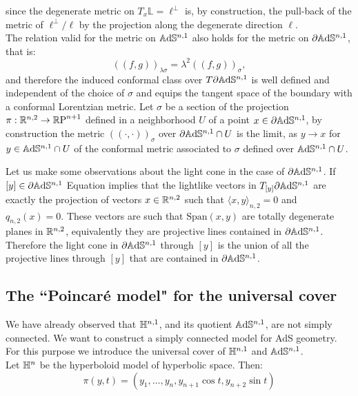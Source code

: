 since the degenerate metric on $T_x\mathbb{L}=\ell^\perp$ is, by construction, the pull-back of the metric of $\ell^{\perp}/\ell$ by the projection along the degenerate direction $\ell$.\\ 
The relation valid for the metric on $\mathbb{A}\mathrm{d}\mathbb{S}^{n,1}$ also holds for the metric on $\partial\mathbb{A}\mathrm{d}\mathbb{S}^{n,1}$, that is: 
\begin{equation}\label{26}
    ((f,g))_{\lambda\sigma}=\lambda^2((f,g))_{\sigma},
\end{equation} 
and therefore the induced conformal class over $T\partial\mathbb{A}\mathrm{d}\mathbb{S}^{n,1}$ is well defined and independent of the choice of $\sigma$ and equips the tangent space of the boundary with a conformal Lorentzian metric. %
Let $\sigma$ be a section of the projection $\pi:\mathbb{R}^{n,2}\to \mathbb{R}\text{P}^{n+1}$ defined in a neighborhood $U$ of a point $x\in\partial\mathbb{A}\mathrm{d}\mathbb{S}^{n,1}$, by construction the metric $((\cdot,\cdot))_\sigma$ over $\partial\mathbb{A}\mathrm{d}\mathbb{S}^{n,1}\cap U$ is the limit, as $y\to x$ for $y\in\mathbb{A}\mathrm{d}\mathbb{S}^{n,1}\cap U$ of the conformal metric associated to $\sigma$ defined over $\mathbb{A}\mathrm{d}\mathbb{S}^{n,1}\cap U$. 
\begin{observation}\label{222}
Let us make some observations about the light cone in the case of $\partial\mathbb{A}\mathrm{d}\mathbb{S}^{n,1}$. If $[y]\in\partial\mathbb{A}\mathrm{d}\mathbb{S}^{n,1}$ Equation  implies that the lightlike vectors in $T_{[y]}\partial\mathbb{A}\mathrm{d}\mathbb{S}^{n,1}$ are exactly the projection of vectors $x\in \mathbb{R}^{n,2}$ such that $\langle x,y\rangle_{n,2}=0$ and $q_{n,2}(x)=0$. These vectors are such that $\text{Span}(x,y)$ are totally degenerate planes in $\mathbb{R}^{n,2}$, equivalently they are projective lines contained in $\partial\mathbb{A}\mathrm{d}\mathbb{S}^{n,1}$. Therefore the light cone in $\partial\mathbb{A}\mathrm{d}\mathbb{S}^{n,1}$ through $[y]$ is the union of all the projective lines through $[y]$ that are contained in $\partial\mathbb{A}\mathrm{d}\mathbb{S}^{n,1}$.

\end{observation}


\subsection{The ``Poincaré model" for the universal cover}
We have already observed that $\mathbb{H}^{n,1}$, and its quotient $\mathbb{A}\mathrm{d}\mathbb{S}^{n,1}$, are not simply connected. We want to construct a simply connected model for AdS geometry. For this purpose we introduce the universal cover of $\mathbb{H}^{n,1}$ and $\mathbb{A}\mathrm{d}\mathbb{S}^{n,1}$.\\
Let $\mathbb{H}^n$ be the hyperboloid model of hyperbolic space. Then: 
\begin{equation}\label{ogcover}
    \pi(y,t)=(y_1,\dots,y_n,y_{n+1}\cos t,y_{n+2}\sin t)
\end{equation}


